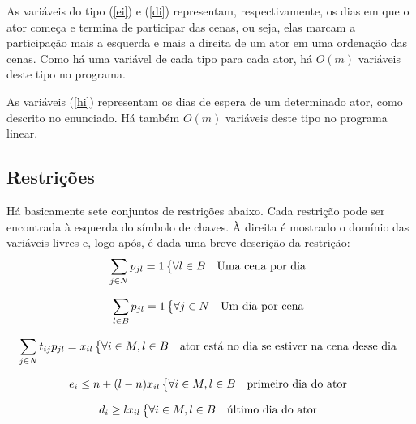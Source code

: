 \documentclass[a4paper,11pt]{article}
\begin{document}
As variáveis do tipo (\ref{ei}) e (\ref{di}) representam, respectivamente, os dias em que o ator
começa e termina de participar das cenas, ou seja, elas marcam a participação
mais a esquerda e mais a direita de um ator em uma ordenação das cenas. Como há
uma variável de cada tipo para cada ator, há $O(m)$ variáveis deste tipo no programa.

As variáveis (\ref{hi}) representam os dias de espera de um determinado ator, como
descrito no enunciado. Há também $O(m)$ variáveis deste tipo no programa linear.
\subsection{Restrições}
Há basicamente sete conjuntos de restrições abaixo. Cada restrição pode ser encontrada
à esquerda do símbolo de chaves. À direita é mostrado o domínio das variáveis livres
e, logo após, é dada uma breve descrição da restrição:
\begin{equation}
  \sum_{j \in N} p_{jl} = 1 \begin{dcases*} \forall l \in B & Uma cena por dia \end{dcases*}
  \label{cena_dia}
\end{equation}

\begin{equation}
  \sum_{l \in B} p_{jl} = 1 \begin{dcases*} \forall j \in N & Um dia por cena \end{dcases*}
  \label{dia_cena}
\end{equation}

\begin{equation}
  \sum_{j \in N} t_{ij} p_{jl} = x_{il} \begin{dcases*} \forall i \in M, l \in B & ator está no dia se estiver na cena desse dia \end{dcases*}
  \label{actor_cene_day}
\end{equation}

\begin{equation}
  e_{i} \leq n + (l-n)x_{il} \begin{dcases*} \forall i \in M, l \in B & primeiro dia do ator \end{dcases*}
  \label{first_day}
\end{equation}

\begin{equation}
  d_{i} \geq lx_{il} \begin{dcases*} \forall i \in M, l \in B & último dia do ator \end{dcases*}
  \label{last_day}
\end{equation}
\end{document}
